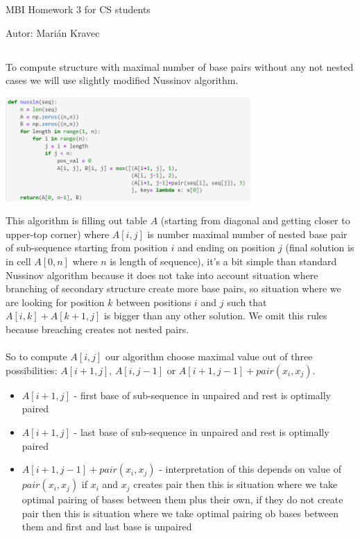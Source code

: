 \documentclass[a4paper]{article}
\begin{document}
 
	
	\pagestyle{plain}
	
	\begin{center}
		\sc\large
		MBI Homework 3 for CS students
	\end{center}
	
	Autor: Marián Kravec
	
	\subsection{}
	
	
	To compute structure with maximal number of base pairs without any not nested cases we will use slightly modified Nussinov algorithm.
	
	\centerline{\includegraphics[width=0.7\textwidth]{nussin_1}}
	
	This algorithm is filling out table $A$ (starting from diagonal and getting closer to upper-top corner) where $A[i, j]$ is number maximal number of nested base pair of sub-sequence starting from position $i$ and ending on position $j$ (final solution is in cell $A[0, n]$ where $n$ is length of sequence), it's a bit simple than standard Nussinov algorithm because it does not take into account situation where branching of secondary structure create more base pairs, so situation where we are looking for position $k$ between positions $i$ and  $j$ such that $A[i, k]+A[k+1, j]$ is bigger than any other solution. We omit this rules because breaching creates not nested pairs.
	\\
	\\
	So to compute $A[i, j]$ our algorithm choose maximal value out of three possibilities: $A[i+1, j]$, $A[i, j-1]$ or $A[i+1, j-1]+pair(x_i, x_j)$. 
	\begin{itemize}
		\item{$A[i+1, j]$} - first base of sub-sequence in unpaired and rest is optimally paired 
		\item{$A[i+1, j]$} - last base of sub-sequence in unpaired and rest is optimally paired 
		\item{$A[i+1, j-1]+pair(x_i, x_j)$} - interpretation of this depends on value of $pair(x_i, x_j)$ if $x_i$ and $x_j$ creates pair then this is situation where we take optimal pairing of bases between them plus their own, if they do not create pair then this is situation where we take optimal pairing ob bases between them and first and last base is unpaired
	\end{itemize}
	
\end{document}
